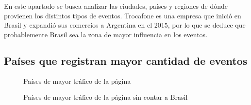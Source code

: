 \documentclass[a4paper]{article}
\begin{document}
En este apartado se busca analizar las ciudades, países y regiones de dónde provienen los distintos tipos de eventos. Trocafone es una empresa que inició en Brasil y expandió sus comercios a Argentina en el 2015, por lo que se deduce que probablemente Brasil sea la zona de mayor influencia en los eventos.

\subsection{Países que registran mayor cantidad de eventos} 

\begin{figure}[h!]
	\caption{Países de mayor tráfico de la página}
	\label{fig:brazilrules}
\end{figure}

\begin{figure}[h!]
	\caption{Países de mayor tráfico de la página sin contar a Brasil}
	\label{fig:brazilsucks}
\end{figure}
\end{document}
